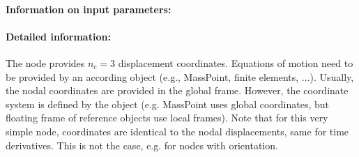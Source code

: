 \paragraph{Information on input parameters:} 
\finishTable
 \noindent
    \paragraph{Detailed information:}
    The node provides $n_c=3$ displacement coordinates. Equations of motion need to be provided by an according object (e.g., MassPoint, finite elements, ...).
    Usually, the nodal coordinates are provided in the global frame. However, the coordinate system is defined by the object (e.g. MassPoint uses global coordinates, but floating frame of reference objects use local frames).
    Note that for this very simple node, coordinates are identical to the nodal displacements, same for time derivatives. This is not the case, e.g. for nodes with orientation. \vspace{6pt}\\

